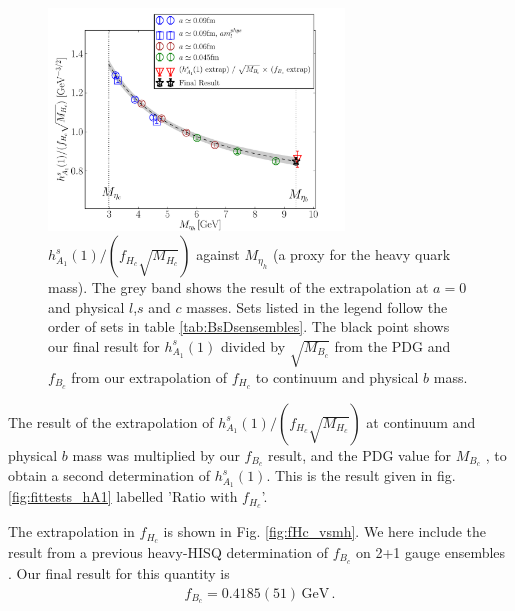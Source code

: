 \begin{figure}[htb!]
  \begin{center}
  \hspace{-10pt}
  \includegraphics[width=0.70\textwidth]{images/BsDsstar/hA1overfHc.pdf}
  \caption{ $h_{A_1}^s(1)/(f_{H_c}\sqrt{M_{H_c}})$ against $M_{\eta_h}$ (a proxy for the heavy quark mass). The grey band shows the result of the extrapolation at $a=0$ and physical $l$,$s$ and $c$ masses. Sets listed in the legend follow the order of sets in table \ref{tab:BsDsensembles}. The black point shows our final result for $h_{A_1}^s(1)$ divided by $\sqrt{M_{B_c}}$ from the PDG \cite{PhysRevD.98.030001} and $f_{B_c}$ from our extrapolation of $f_{H_c}$ to continuum and physical $b$ mass. \label{fig:fHc}}
  \end{center}
\end{figure}

The result of the extrapolation of $h_{A_1}^s(1)/(f_{H_c}\sqrt{M_{H_c}})$ at continuum and physical $b$ mass was multiplied by our $f_{B_c}$ result, and the PDG value for $M_{B_c}$ \cite{PhysRevD.98.030001}, to obtain a second determination of $h_{A_1}^s(1)$. This is the result given in fig. \ref{fig:fittests_hA1} labelled 'Ratio with $f_{H_c}$'.

The extrapolation in $f_{H_c}$ is shown in Fig. \ref{fig:fHc_vsmh}. We here include the result from a previous heavy-HISQ determination of $f_{B_c}$ on 2+1 gauge ensembles \cite{McNeile:2012qf}. Our final result for this quantity is
\begin{align}
  f_{B_c} = 0.4185(51)\,\text{GeV}\,.
\end{align}

